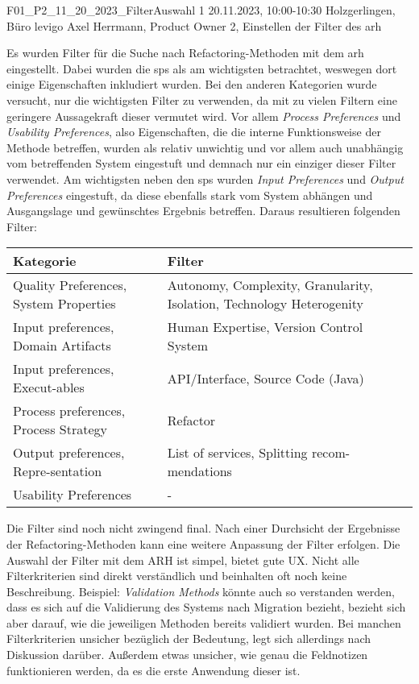 \fieldnote
{F01\_P2\_11\_20\_2023\_FilterAuswahl}
{1}
{20.11.2023, 10:00-10:30}
{Holzgerlingen, Büro levigo}
{Axel Herrmann, Product Owner}
{2, Einstellen der Filter des \gls{arh}}
{
	Es wurden Filter für die Suche nach Refactoring-Methoden mit dem \gls{arh} eingestellt.
	Dabei wurden die \glspl{sp} als am wichtigsten betrachtet, weswegen dort einige Eigenschaften inkludiert wurden.
	Bei den anderen Kategorien wurde versucht, nur die wichtigsten Filter zu verwenden, da mit zu vielen Filtern eine geringere Aussagekraft dieser vermutet wird.
	Vor allem \emph{Process Preferences} und \emph{Usability Preferences}, also Eigenschaften, die die interne Funktionsweise der Methode betreffen, wurden als relativ unwichtig und vor allem auch unabhängig vom betreffenden System eingestuft und demnach nur ein einziger dieser Filter verwendet.
	Am wichtigsten neben den \glspl{sp} wurden \emph{Input Preferences} und \emph{Output Preferences} eingestuft, da diese ebenfalls stark vom System abhängen und Ausgangslage und gewünschtes Ergebnis betreffen.
	Daraus resultieren folgenden Filter:
	\begin{tabular}{|p{4.5cm}|p{5.5cm}|}
		\hline
		\textbf{Kategorie} & \textbf{Filter} \\ \hline
		Quality Preferences, System Properties & Autonomy, Complexity, Granularity, Isolation, Technology Heterogenity \\ \hline
		Input preferences, Domain Artifacts & Human Expertise, Version Control System \\ \hline
		Input preferences, Execut-ables & API/Interface, Source Code (Java) \\ \hline
		Process preferences, Process Strategy & Refactor \\ \hline
		Output preferences, Repre-sentation & List of services, Splitting recom-mendations \\ \hline
		Usability Preferences & - \\ \hline
	\end{tabular}
}
{
	Die Filter sind noch nicht zwingend final. Nach einer Durchsicht der Ergebnisse der Refactoring-Methoden kann eine weitere Anpassung der Filter erfolgen.
}
{
	Die Auswahl der Filter mit dem ARH ist simpel, bietet gute UX.
}
{
	Nicht alle Filterkriterien sind direkt verständlich und beinhalten oft noch keine Beschreibung. Beispiel: \emph{Validation Methods} könnte auch so verstanden werden, dass es sich auf die Validierung des Systems nach Migration bezieht, bezieht sich aber darauf, wie die jeweiligen Methoden bereits validiert wurden.
}
{
	Bei manchen Filterkriterien unsicher bezüglich der Bedeutung, legt sich allerdings nach Diskussion darüber.
	Außerdem etwas unsicher, wie genau die Feldnotizen funktionieren werden, da es die erste Anwendung dieser ist.
}
